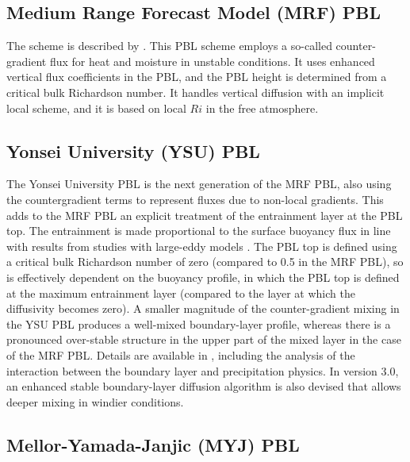 \subsection {Medium Range Forecast Model (MRF) PBL}

The scheme is described by \citet{hong96}. 
This PBL scheme employs a so-called counter-gradient flux for heat and moisture 
in unstable conditions. It uses enhanced vertical flux coefficients in the PBL, 
and the PBL height is determined from a critical bulk Richardson number. 
It handles vertical diffusion with an implicit local scheme, and it is based 
on local $Ri$ in the free atmosphere.

\subsection{Yonsei University (YSU) PBL}

The Yonsei University PBL \citep{hong06} is the next generation of the MRF PBL, also using the countergradient terms to represent fluxes due to non-local gradients. This adds to the MRF PBL \citep{hong96} an explicit treatment of the entrainment layer at the PBL top. The entrainment is made proportional to the surface buoyancy flux in line with results from studies with large-eddy models \citep{noh03}. The PBL top is defined using a critical bulk Richardson number of zero (compared to 0.5 in the MRF PBL), so is effectively dependent on the buoyancy profile, in which the PBL top is defined at the maximum entrainment layer (compared to the layer at which the diffusivity becomes zero). A smaller magnitude of the counter-gradient mixing in the YSU PBL produces a well-mixed boundary-layer profile, whereas there is a pronounced over-stable structure in the upper part of the mixed layer in the case of the MRF PBL. Details are available in \citet{hong06}, including the analysis of the interaction between the boundary layer and precipitation physics. In version 3.0, an enhanced stable boundary-layer diffusion algorithm \citep{hong07} is also devised that allows deeper mixing in windier conditions.

\subsection{Mellor-Yamada-Janjic (MYJ) PBL}

